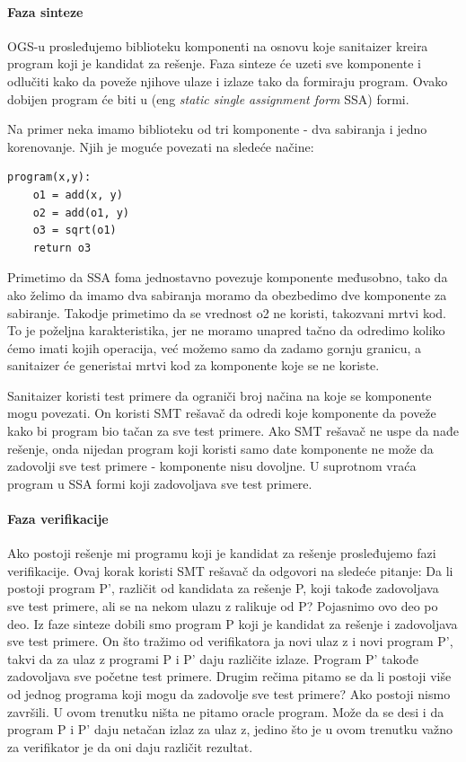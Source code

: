 \paragraph{Faza sinteze}

 OGS-u prosleđujemo biblioteku komponenti na osnovu koje sanitaizer kreira program koji je kandidat za rešenje. Faza sinteze će uzeti sve komponente i odlučiti kako da poveže njihove ulaze i izlaze tako da formiraju program. Ovako dobijen program će biti u (eng \emph{static single assignment form} SSA) formi.
 
 Na primer neka imamo biblioteku od tri komponente - dva sabiranja i jedno korenovanje. Njih je moguće povezati na sledeće načine:

\begin{lstlisting}
program(x,y):
	o1 = add(x, y)
	o2 = add(o1, y)
	o3 = sqrt(o1)
	return o3
\end{lstlisting}
 
 Primetimo da SSA foma jednostavno povezuje komponente međusobno, tako da ako želimo da imamo dva sabiranja moramo da obezbedimo dve komponente za sabiranje. Takodje primetimo da se vrednost o2 ne koristi, takozvani mrtvi kod. To je poželjna karakteristika, jer ne moramo unapred tačno da odredimo koliko ćemo imati kojih operacija, već možemo samo da zadamo gornju granicu, a sanitaizer će generistai mrtvi kod za komponente koje se ne koriste.
 
 Sanitaizer koristi test primere da ograniči broj načina na koje se komponente mogu povezati. On koristi SMT rešavač da odredi koje komponente da poveže kako bi program bio tačan za sve test primere. Ako SMT rešavač ne uspe da nađe rešenje, onda nijedan program koji koristi samo date komponente ne može da zadovolji sve test primere - komponente nisu dovoljne. U suprotnom vraća program u SSA formi koji zadovoljava sve test primere.
 
 \paragraph{Faza verifikacije}

Ako postoji rešenje mi programu koji je kandidat za rešenje prosleđujemo fazi verifikacije. Ovaj korak koristi SMT rešavač da odgovori na sledeće pitanje: Da li postoji program P', različit od kandidata za rešenje P, koji takođe zadovoljava sve test primere, ali se na nekom ulazu z ralikuje od P?
Pojasnimo ovo deo po deo. Iz faze sinteze dobili smo program P koji je kandidat za rešenje i zadovoljava sve test primere. On što tražimo od verifikatora ja novi ulaz z i novi program P', takvi da za ulaz z programi P i P' daju različite izlaze. Program P' takođe zadovoljava sve početne test primere.
Drugim rečima pitamo se da li postoji više od jednog programa koji mogu da zadovolje sve test primere? Ako postoji nismo završili.
U ovom trenutku ništa ne pitamo oracle program. Može da se desi i da program P i P' daju netačan izlaz za ulaz z, jedino što je u ovom trenutku važno za verifikator je da oni daju različit rezultat.

